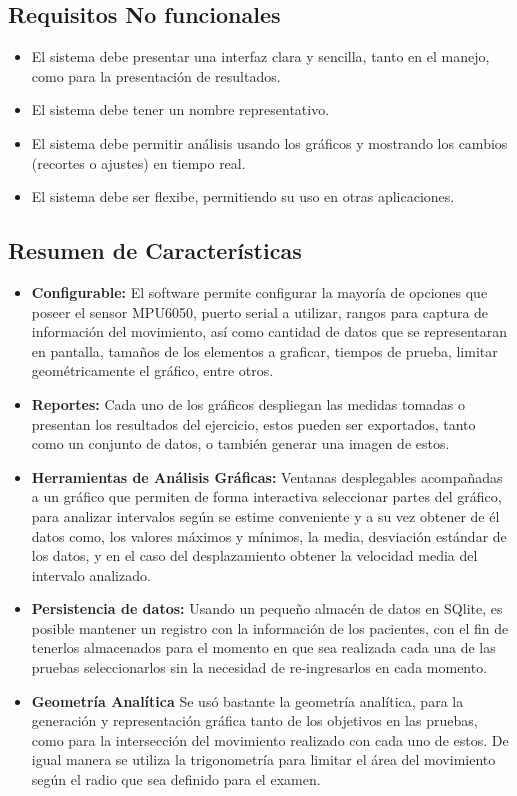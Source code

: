 \documentclass[12pt,a4paper]{article}
\begin{document}
\subsection{Requisitos No funcionales}
\begin{itemize}
	\item El sistema debe presentar una interfaz clara y sencilla, tanto en el manejo, como para la presentación de resultados.
	\item El sistema debe tener un nombre representativo.
	\item El sistema debe permitir análisis usando los gráficos y mostrando los cambios (recortes o ajustes) en tiempo real.
	\item El sistema debe ser flexibe, permitiendo su uso en otras aplicaciones.
\end{itemize}

\newpage
\subsection{Resumen de Características}
\begin{itemize}
	\item \textbf{Configurable:} El software permite configurar la mayoría de opciones que poseer el sensor MPU6050, puerto serial a utilizar, rangos para captura de información del movimiento, así como cantidad de datos que se representaran en pantalla, tamaños de los elementos a graficar, tiempos de prueba, limitar geométricamente el gráfico, entre otros.
	\item \textbf{Reportes:} Cada uno de los gráficos despliegan las medidas tomadas o presentan los resultados del ejercicio, estos pueden ser exportados, tanto como un conjunto de datos, o también generar una imagen de estos.
	\item \textbf{Herramientas de Análisis Gráficas:} Ventanas desplegables acompañadas a un gráfico que permiten de forma interactiva seleccionar partes del gráfico, para analizar intervalos según se estime conveniente y a su vez obtener de él datos como, los valores máximos y mínimos, la media, desviación estándar de los datos, y en el caso del desplazamiento obtener la velocidad media del intervalo analizado.
	\item \textbf{Persistencia de datos:} Usando un pequeño almacén de datos en SQlite, es posible mantener un registro con la información de los pacientes, con el fin de tenerlos almacenados para el momento en que sea realizada cada una de las pruebas seleccionarlos sin la necesidad de re-ingresarlos en cada momento.
	\item \textbf{Geometría Analítica} Se usó bastante la geometría analítica, para la generación y representación gráfica tanto de los objetivos en las pruebas, como para la intersección del movimiento realizado con cada uno de estos. De igual manera se utiliza la trigonometría para limitar el área del movimiento según el radio que sea definido para el examen.
\end{itemize}
\end{document}
